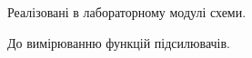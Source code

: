 \documentclass[a4paper,14pt]{extreport}
\begin{document}

\begin{figure}[h]
\label{ris6}
\caption{Реалізовані в лабораторному модулі схеми.}
\end{figure}


\begin{figure}[h]
До вимірюванню функцій підсилювачів.
\label{ris2}
\end{figure}
\end{document}
